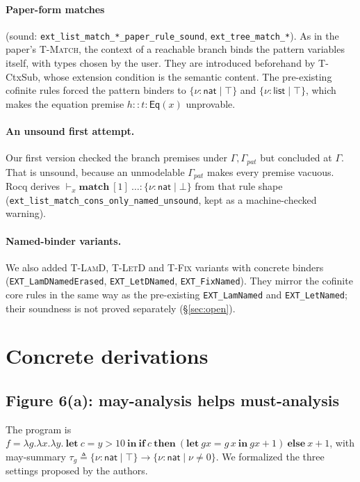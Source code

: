 \documentclass[10pt]{article}
\newcommand{\ov}[2]{\{\nu{:}#1 \mid #2\}}          %
\newcommand{\Eq}[1]{\mathsf{Eq}(#1)}                %
\newcommand{\Nat}{\mathsf{nat}}
\newcommand{\List}{\mathsf{list}}
\newcommand{\entc}{\mathrel{,}}
\newcommand{\vd}{\vdash_{\!x}}
\newcommand{\kw}[1]{\ensuremath{\mathbf{#1}}}
\newcommand{\rocq}[1]{\texttt{#1}}
\newcommand{\RN}[1]{\textsc{#1}}
\begin{document}
\paragraph{Paper-form matches} (sound: \rocq{ext\_list\_match\_*\_paper\_rule\_sound},
\rocq{ext\_tree\_match\_*}). As in the paper's \RN{T-Match}, the context of a
reachable branch binds the pattern variables itself, with types chosen by the
user. They are introduced beforehand by T-CtxSub, whose extension condition is
the semantic content. The pre-existing cofinite rules forced the pattern
binders to $\ov{\Nat}{\top}$ and $\ov{\List}{\top}$, which makes the equation
premise $h::t:\Eq{x}$ unprovable.

\paragraph{An unsound first attempt.} Our first version checked the branch
premises under $\Gamma\entc\Gamma_{\mathit{pat}}$ but concluded at $\Gamma$.
That is unsound, because an unmodelable $\Gamma_{\mathit{pat}}$ makes every
premise vacuous. Rocq derives
$\vd \kw{match}\ [1]\ \ldots : \ov{\Nat}{\bot}$ from that rule shape
(\rocq{ext\_list\_match\_cons\_only\_named\_unsound}, kept as a
machine-checked warning).

\paragraph{Named-binder variants.} We also added \RN{T-LamD}, \RN{T-LetD} and
\RN{T-Fix} variants with concrete binders
(\rocq{EXT\_LamDNamedErased}, \rocq{EXT\_LetDNamed}, \rocq{EXT\_FixNamed}). They
mirror the cofinite core rules in the same way as the pre-existing
\rocq{EXT\_LamNamed} and \rocq{EXT\_LetNamed}; their soundness is not proved
separately (\S\ref{sec:open}).

\section{Concrete derivations}

\subsection{Figure 6(a): may-analysis helps must-analysis}\label{sec:fig6a}

The program is
$f = \lambda g.\lambda x.\lambda y.\ \kw{let}\ c = y > 10\ \kw{in}\
\kw{if}\ c\ \kw{then}\ (\kw{let}\ gx = g\,x\ \kw{in}\ gx + 1)\ \kw{else}\ x + 1$,
with may-summary $\tau_g \triangleq \ov{\Nat}{\top}\to\ov{\Nat}{\nu\neq 0}$.
We formalized the three settings proposed by the authors.
\end{document}
